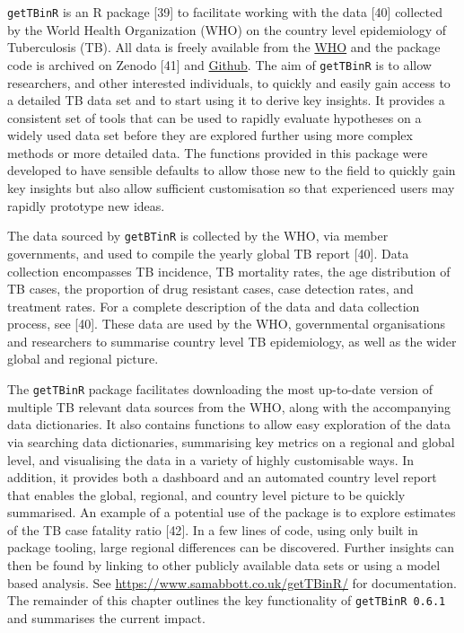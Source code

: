 \documentclass[11pt,twoside]{bristolthesis}
\begin{document}
  \texttt{getTBinR} is an R package {[}39{]} to facilitate working with the data {[}40{]} collected by the World Health Organization (WHO) on the country level epidemiology of Tuberculosis (TB). All data is freely available from the \href{https://www.who.int/tb/country/data/download/en/}{WHO} and the package code is archived on Zenodo {[}41{]} and \href{https://www.samabbott.co.uk/getTBinR/}{Github}. The aim of \texttt{getTBinR} is to allow researchers, and other interested individuals, to quickly and easily gain access to a detailed TB data set and to start using it to derive key insights. It provides a consistent set of tools that can be used to rapidly evaluate hypotheses on a widely used data set before they are explored further using more complex methods or more detailed data. The functions provided in this package were developed to have sensible defaults to allow those new to the field to quickly gain key insights but also allow sufficient customisation so that experienced users may rapidly prototype new ideas.
  
  The data sourced by \texttt{getBTinR} is collected by the WHO, via member governments, and used to compile the yearly global TB report {[}40{]}. Data collection encompasses TB incidence, TB mortality rates, the age distribution of TB cases, the proportion of drug resistant cases, case detection rates, and treatment rates. For a complete description of the data and data collection process, see {[}40{]}. These data are used by the WHO, governmental organisations and researchers to summarise country level TB epidemiology, as well as the wider global and regional picture.
  
  The \texttt{getTBinR} package facilitates downloading the most up-to-date version of multiple TB relevant data sources from the WHO, along with the accompanying data dictionaries. It also contains functions to allow easy exploration of the data via searching data dictionaries, summarising key metrics on a regional and global level, and visualising the data in a variety of highly customisable ways. In addition, it provides both a dashboard and an automated country level report that enables the global, regional, and country level picture to be quickly summarised. An example of a potential use of the package is to explore estimates of the TB case fatality ratio {[}42{]}. In a few lines of code, using only built in package tooling, large regional differences can be discovered. Further insights can then be found by linking to other publicly available data sets or using a model based analysis. See \url{https://www.samabbott.co.uk/getTBinR/} for documentation. The remainder of this chapter outlines the key functionality of \texttt{getTBinR\ 0.6.1} and summarises the current impact.
  
\end{document}

